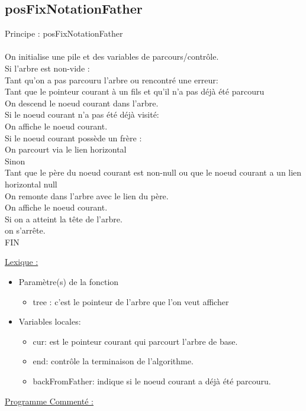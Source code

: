 \documentclass[a4paper]{article}
\newcommand\tab[1][1cm]{\hspace*{#1}}
\begin{document}
\subsection{posFixNotationFather}
\begin{algorithm}
Principe : posFixNotationFather
\\
\\
\tab On initialise une pile et des variables de parcours/contrôle.
\\
\tab Si l'arbre est non-vide :
\\
\tab \tab Tant qu'on a pas parcouru l'arbre ou rencontré une erreur:
\\
\tab \tab \tab Tant que le pointeur courant à un fils et qu'il n'a pas déjà été parcouru
\\
\tab \tab \tab \tab On descend le noeud courant dans l'arbre.
\\
\tab \tab \tab Si le noeud courant n'a pas été déjà visité:
\\
\tab \tab \tab \tab On affiche le noeud courant.
\\
\tab \tab \tab Si le noeud courant possède un frère :
\\
\tab \tab \tab \tab On parcourt via le lien horizontal
\\
\tab \tab \tab Sinon
\\
\tab \tab \tab \tab Tant que le père du noeud courant est non-null ou que le noeud courant a un lien 
\\
\tab \tab \tab \tab horizontal null
\\
\tab \tab \tab \tab \tab On remonte dans l'arbre avec le lien du père.
\\
\tab \tab \tab \tab \tab On affiche le noeud courant.
\\
\tab \tab \tab \tab Si on a atteint la tête de l'arbre.
\\
\tab \tab \tab \tab \tab on s'arrête.
\\
FIN
\end{algorithm}
\underline{Lexique :}
\begin{itemize}
\item Paramètre(s) de la fonction  
\begin{itemize}
\item tree : c'est le pointeur de l'arbre que l'on veut afficher
\end{itemize}
\item Variables locales:
\begin{itemize}
\item cur: est le pointeur courant qui parcourt l'arbre de base.
\item end: contrôle la terminaison de l'algorithme.
\item backFromFather: indique si le noeud courant a déjà été parcouru.
\end{itemize}
\end{itemize}
\underline{Programme Commenté :}
\end{document}
